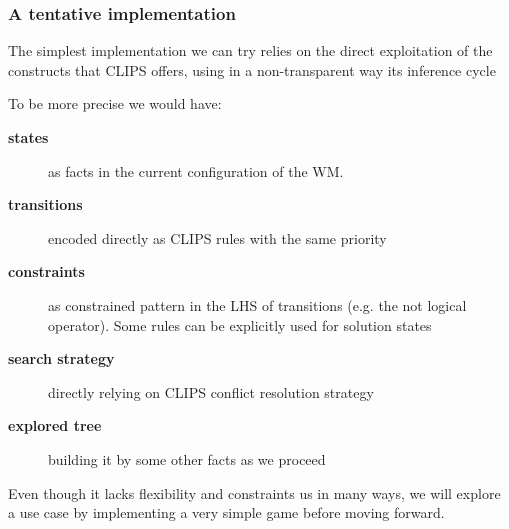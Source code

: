 \documentclass[xcolor={usenames,dvipsnames,svgnames}, compress]{beamer}
\begin{document}
\begin{frame}
  \frametitle{A tentative implementation}
  The simplest implementation we can try relies on the direct
  exploitation of the constructs that CLIPS offers, using in a
  non-transparent way its inference cycle\par\bigskip
  To be more precise we would have:
  \begin{description}
  \item[\textbf{states}] as facts in the current configuration of the WM.
  \item[\textbf{transitions}] encoded directly as CLIPS rules with the
    same priority
  \item[\textbf{constraints}] as constrained pattern in the LHS of
    transitions (e.g. the \textsf{not} logical operator). Some rules
    can be explicitly used for solution states
  \item[\textbf{search strategy}] directly relying on CLIPS conflict
    resolution strategy
  \item[\textbf{explored tree}] building it by some other facts as we
    proceed
  \end{description}
  Even though it lacks flexibility and constraints us in many ways, we
  will explore a use case by implementing a very simple game before moving forward. 
\end{frame}
\end{document}

